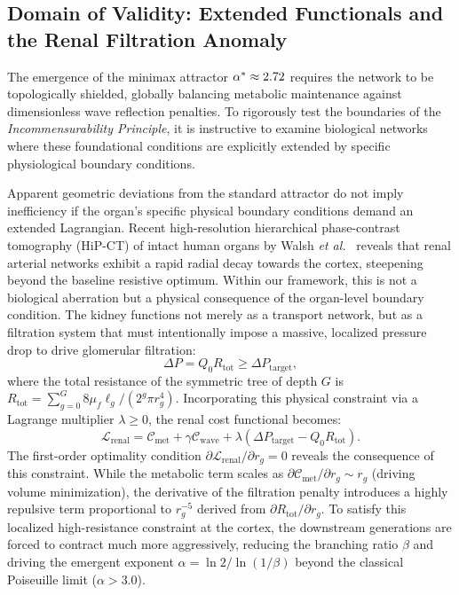 \subsection{Domain of Validity: Extended Functionals and the Renal Filtration Anomaly}

The emergence of the minimax attractor $\alpha^* \approx 2.72$ requires
the network to be topologically shielded, globally balancing metabolic
maintenance against dimensionless wave reflection penalties. To rigorously test
the boundaries of the \textit{Incommensurability Principle}, it is instructive
to examine biological networks where these foundational conditions are
explicitly extended by specific physiological boundary conditions.

Apparent geometric deviations from the standard attractor do not imply
inefficiency if the organ's specific physical boundary conditions demand an
extended Lagrangian. Recent high-resolution hierarchical phase-contrast
tomography (HiP-CT) of intact human organs by Walsh \textit{et
al.}~\cite{walsh2021} reveals that renal arterial networks exhibit a rapid
radial decay towards the cortex, steepening beyond the baseline resistive
optimum. Within our framework, this is not a biological aberration but a
physical consequence of the organ-level boundary condition. The kidney
functions not merely as a transport network, but as a filtration system that
must intentionally impose a massive, localized pressure drop to drive glomerular
filtration:
\begin{equation}
    \Delta P = Q_0 R_{\mathrm{tot}} \ge \Delta P_{\mathrm{target}},
\end{equation}
where the total resistance of the symmetric tree of depth $G$ is
$R_{\mathrm{tot}} = \sum_{g=0}^{G} 8 \mu_f \ell_g / (2^g \pi r_g^4)$.
Incorporating this physical constraint via a Lagrange multiplier $\lambda \ge
0$, the renal cost functional becomes:
\begin{equation}
    \mathcal{L}_{\mathrm{renal}} = \mathcal{C}_{\mathrm{met}} + \gamma \mathcal{C}_{\mathrm{wave}} + \lambda \left( \Delta P_{\mathrm{target}} - Q_0 R_{\mathrm{tot}} \right).
\end{equation}
The first-order optimality condition $\partial \mathcal{L}_{\mathrm{renal}} /
\partial r_g = 0$ reveals the consequence of this constraint. While the
metabolic term scales as $\partial \mathcal{C}_{\mathrm{met}} / \partial r_g
\sim r_g$ (driving volume minimization), the derivative of the filtration
penalty introduces a highly repulsive term proportional to $r_g^{-5}$ derived
from $\partial R_{\mathrm{tot}} / \partial r_g$. To satisfy this localized
high-resistance constraint at the cortex, the downstream generations are forced
to contract much more aggressively, reducing the branching ratio $\beta$ and
driving the emergent exponent $\alpha = \ln 2 / \ln(1/\beta)$ beyond the
classical Poiseuille limit ($\alpha > 3.0$).

